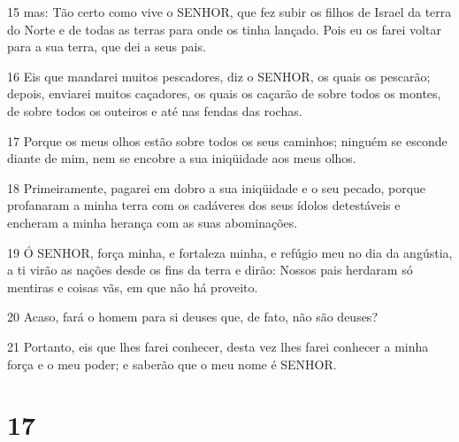 \par 15 mas: Tão certo como vive o SENHOR, que fez subir os filhos de Israel da terra do Norte e de todas as terras para onde os tinha lançado. Pois eu os farei voltar para a sua terra, que dei a seus pais.
\par 16 Eis que mandarei muitos pescadores, diz o SENHOR, os quais os pescarão; depois, enviarei muitos caçadores, os quais os caçarão de sobre todos os montes, de sobre todos os outeiros e até nas fendas das rochas.
\par 17 Porque os meus olhos estão sobre todos os seus caminhos; ninguém se esconde diante de mim, nem se encobre a sua iniqüidade aos meus olhos.
\par 18 Primeiramente, pagarei em dobro a sua iniqüidade e o seu pecado, porque profanaram a minha terra com os cadáveres dos seus ídolos detestáveis e encheram a minha herança com as suas abominações.
\par 19 Ó SENHOR, força minha, e fortaleza minha, e refúgio meu no dia da angústia, a ti virão as nações desde os fins da terra e dirão: Nossos pais herdaram só mentiras e coisas vãs, em que não há proveito.
\par 20 Acaso, fará o homem para si deuses que, de fato, não são deuses?
\par 21 Portanto, eis que lhes farei conhecer, desta vez lhes farei conhecer a minha força e o meu poder; e saberão que o meu nome é SENHOR.

\chapter{17}


